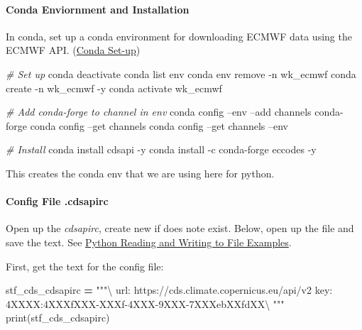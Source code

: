 \documentclass[
]{book}
\newenvironment{Shaded}{\begin{snugshade}}{\end{snugshade}}
\newcommand{\BuiltInTok}[1]{#1}
\newcommand{\CommentTok}[1]{\textcolor[rgb]{0.56,0.35,0.01}{\textit{#1}}}
\newcommand{\ExtensionTok}[1]{#1}
\newcommand{\NormalTok}[1]{#1}
\newcommand{\OperatorTok}[1]{\textcolor[rgb]{0.81,0.36,0.00}{\textbf{#1}}}
\newcommand{\StringTok}[1]{\textcolor[rgb]{0.31,0.60,0.02}{#1}}
\begin{document}
\hypertarget{conda-enviornment-and-installation}{%
\paragraph{Conda Enviornment and Installation}\label{conda-enviornment-and-installation}}

In conda, set up a conda environment for downloading ECMWF data using the ECMWF API. (\href{https://fanwangecon.github.io/Tex4Econ/nontex/install/windows/fn_installations.html}{Conda Set-up})

\begin{Shaded}
\begin{Highlighting}[]
\CommentTok{# Set up}
\ExtensionTok{conda}\NormalTok{ deactivate}
\ExtensionTok{conda}\NormalTok{ list env}
\ExtensionTok{conda}\NormalTok{ env remove -n wk_ecmwf}
\ExtensionTok{conda}\NormalTok{ create -n wk_ecmwf -y}
\ExtensionTok{conda}\NormalTok{ activate wk_ecmwf}

\CommentTok{# Add conda-forge to channel in env}
\ExtensionTok{conda}\NormalTok{ config --env --add channels conda-forge}
\ExtensionTok{conda}\NormalTok{ config --get channels}
\ExtensionTok{conda}\NormalTok{ config --get channels --env}

\CommentTok{# Install}
\ExtensionTok{conda}\NormalTok{ install cdsapi -y}
\ExtensionTok{conda}\NormalTok{ install -c conda-forge eccodes -y}
\end{Highlighting}
\end{Shaded}

This creates the conda env that we are using here for python.

\hypertarget{config-file-.cdsapirc}{%
\paragraph{Config File .cdsapirc}\label{config-file-.cdsapirc}}

Open up the \emph{cdsapirc}, create new if does note exist. Below, open up the file and save the text. See \href{https://fanwangecon.github.io/pyfan/vig/support/inout/htmlpdfr/fp_files.html}{Python Reading and Writing to File Examples}.

First, get the text for the config file:

\begin{Shaded}
\begin{Highlighting}[]
\NormalTok{stf_cds_cdsapirc }\OperatorTok{=} \StringTok{"""\textbackslash{}}
\StringTok{url: https://cds.climate.copernicus.eu/api/v2}
\StringTok{key: 4XXXX:4XXXfXXX-XXXf-4XXX-9XXX-7XXXebXXfdXX\textbackslash{}}
\StringTok{"""}
\BuiltInTok{print}\NormalTok{(stf_cds_cdsapirc)}
\end{Highlighting}
\end{Shaded}
\end{document}

